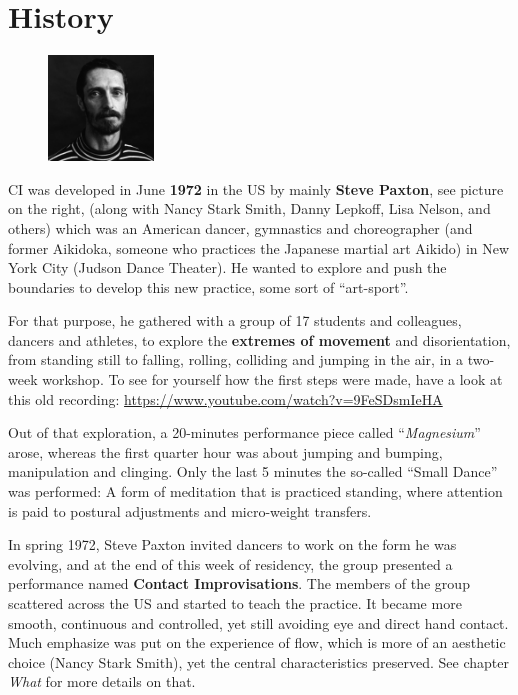 \section{History}\label{sec:history}

\begin{figure}
\centering
\includegraphics[width=0.25\textwidth]{images/history}
\end{figure}

CI was developed in June \textbf{1972} in the US by mainly \textbf{Steve Paxton}, see picture on the right, (along with Nancy Stark Smith, Danny Lepkoff, Lisa Nelson, and others) which was an American dancer, gymnastics and choreographer (and former Aikidoka, someone who practices the Japanese martial art Aikido) in New York City (Judson Dance Theater).
He wanted to explore and push the boundaries to develop this new practice, some sort of ``art-sport''.

For that purpose, he gathered with a group of 17 students and colleagues, dancers and athletes, to explore the \textbf{extremes of movement} and disorientation, from standing still to falling, rolling, colliding and jumping in the air, in a two-week workshop.
To see for yourself how the first steps were made, have a look at this old recording: \url{https://www.youtube.com/watch?v=9FeSDsmIeHA}

Out of that exploration, a 20-minutes performance piece called ``\textit{Magnesium}'' arose, whereas the first quarter hour was about jumping and bumping, manipulation and clinging.
Only the last 5 minutes the so-called ``Small Dance'' was performed: A form of meditation that is practiced standing, where attention is paid to postural adjustments and micro-weight transfers.

In spring 1972, Steve Paxton invited dancers to work on the form he was evolving, and at the end of this week of residency, the group presented a performance named \textbf{Contact Improvisations}.
The members of the group scattered across the US and started to teach the practice.
It became more smooth, continuous and controlled, yet still avoiding eye and direct hand contact.
Much emphasize was put on the experience of flow, which is more of an aesthetic choice (Nancy Stark Smith), yet the central characteristics preserved.
See chapter \textit{What} for more details on that.

